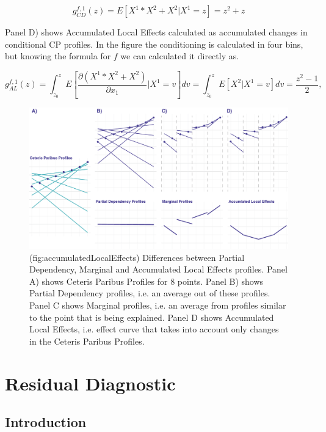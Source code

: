 \documentclass[12pt,]{krantz}
\begin{document}
\[
g_{CD}^{f,1}(z) = E[X^1*X^2 + X^2 | X^1 = z] = z^2+z
\]

Panel D) shows Accumulated Local Effects calculated as accumulated changes in conditional CP profiles. In the figure the conditioning is calculated in four bins, but knowing the formula for \(f\) we can calculated it directly as.

\[
g_{AL}^{f,1}(z) = \int_{z_0}^z E\left[\frac{\partial (X^1*X^2 + X^2)}{\partial x_1}|X^1 = v\right] dv  = \int_{z_0}^z E\left[X^2|X^1 = v\right] dv  = \frac{z^2 -1 }{2},
\]

\begin{figure}

{\centering \includegraphics[width=0.9\linewidth]{figure/CP_ALL} 

}

\caption{(fig:accumulatedLocalEffects) Differences between Partial Dependency, Marginal and Accumulated Local Effects profiles. Panel A) shows Ceteris Paribus Profiles for 8 points. Panel B) shows Partial Dependency profiles, i.e. an average out of these profiles. Panel C shows Marginal profiles, i.e. an average from profiles similar to the point that is being explained. Panel D shows Accumulated Local Effects, i.e. effect curve that takes into account only changes in the Ceteris Paribus Profiles.}\label{fig:accumulatedLocalEffects}
\end{figure}

\hypertarget{residualDiagnostic}{%
\section{Residual Diagnostic}\label{residualDiagnostic}}

\hypertarget{introduction-1}{%
\subsection{Introduction}\label{introduction-1}}
\end{document}
